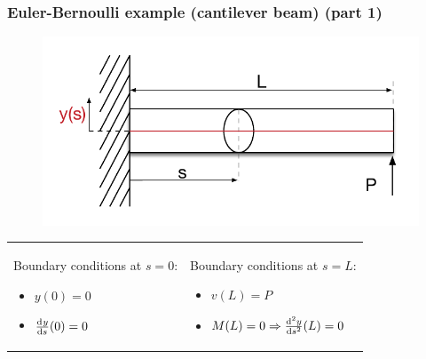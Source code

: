 \begin{frame}
  \frametitle{Euler-Bernoulli example (cantilever beam) (part 1)}
  
  \begin{figure}
    \centering
    \includegraphics[width=16cm, keepaspectratio=true]{sections/traditional_beams/images/EulerCanitleverExample1part1}
  \end{figure}
  
  \begin{tabularx}{\linewidth}{XX}
    {
      Boundary conditions at $s=0$:
      \begin{itemize}
        \item $y(0) = 0$
        \item $\od{y}{s}(0) = 0$
      \end{itemize}
    } & {
      Boundary conditions at $s=L$:
      \begin{itemize}
        \item $v(L) = P$
        \item $M(L) = 0 \Rightarrow \od[2]{y}{s}(L) = 0$
      \end{itemize}
    }
  \end{tabularx}
  
\end{frame}

